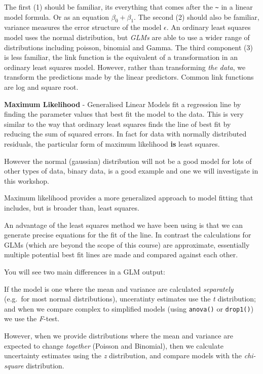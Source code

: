 \documentclass[
]{book}
\makeatletter
\newenvironment{kframe}{%
\medskip{}
\setlength{\fboxsep}{.8em}
 \def\at@end@of@kframe{}%
 \ifinner\ifhmode%
  \def\at@end@of@kframe{\end{minipage}}%
  \begin{minipage}{\columnwidth}%
 \fi\fi%
 \def\FrameCommand##1{\hskip\@totalleftmargin \hskip-\fboxsep
 \colorbox{shadecolor}{##1}\hskip-\fboxsep
     \hskip-\linewidth \hskip-\@totalleftmargin \hskip\columnwidth}%
 \MakeFramed {\advance\hsize-\width
   \@totalleftmargin\z@ \linewidth\hsize
   \@setminipage}}%
 {\par\unskip\endMakeFramed%
 \at@end@of@kframe}
\newenvironment{block}[1]
  {
  \begin{itemize}
  \renewcommand{\labelitemi}{
    \raisebox{-.7\height}[0pt][0pt]{
      {\setkeys{Gin}{width=3em,keepaspectratio}\texttt{[image: images/\#1]}}
    }
  }
  \setlength{\fboxsep}{1em}
  \begin{kframe}
  \item
  }
  {
  \end{kframe}
  \end{itemize}
  }
\newenvironment{rmdnote}
  {\begin{block}{note}}
  {\end{block}}
\makeatother
\begin{document}
The first (1) should be familiar, its everything that comes after the \texttt{\textasciitilde{}} in a linear model formula. Or as an equation \(\beta_0 + \beta_1\). The second (2) should also be familiar, variance measures the error structure of the model \(\epsilon\). An ordinary least squares model uses the normal distribution, but \emph{GLMs} are able to use a wider range of distributions including poisson, binomial and Gamma. The third component (3) is less familiar, the link function is the equivalent of a transformation in an ordinary least squares model. However, rather than transforming \emph{the data}, we transform the predictions made by the linear predictors. Common link functions are log and square root.

\begin{rmdnote}
\textbf{Maximum Likelihood} - Generalised Linear Models fit a regression
line by finding the parameter values that best fit the model to the
data. This is very similar to the way that ordinary least squares finds
the line of best fit by reducing the sum of squared errors. In fact for
data with normally distributed residuals, the particular form of maximum
likelihood \textbf{is} least squares.

However the normal (gaussian) distribution will not be a good model for
lots of other types of data, binary data, is a good example and one we
will investigate in this workshop.

Maximum likelihood provides a more generalized approach to model fitting
that includes, but is broader than, least squares.

An advantage of the least squares method we have been using is that we
can generate precise equations for the fit of the line. In contrast the
calculations for GLMs (which are beyond the scope of this course) are
approximate, essentially multiple potential best fit lines are made and
compared against each other.

You will see two main differences in a GLM output:

If the model is one where the mean and variance are calculated
\emph{separately} (e.g.~for most normal distributions), unceratinty
estimates use the \emph{t} distribution; and when we compare complex to
simplified models (using \texttt{anova()} or \texttt{drop1()}) we use
the \emph{F}-test.

However, when we provide distributions where the mean and variance are
expected to change \emph{together} (Poisson and Binomial), then we
calculate uncertainty estimates using the \emph{z} distribution, and
compare models with the \emph{chi-square} distribution.
\end{rmdnote}
\end{document}
